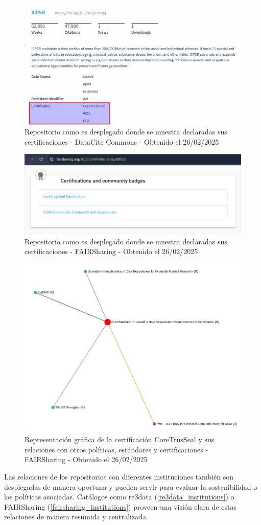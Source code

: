 \documentclass[runningheads]{llncs}
\begin{document}
\begin{figure}
    \centering
    \includegraphics[width=0.5\linewidth]{img/datacite_certified_repo.png}
    \caption{Repositorio como es desplegado donde se muestra declaradas sus certificaciones - DataCite Commons - Obtenido el 26/02/2025}
    \label{fig:datacite_certified_repo}
\end{figure}

\begin{figure}
    \centering
    \includegraphics[width=0.5\linewidth]{img/fairsharing_certified_repo.png}
    \caption{Repositorio como es desplegado donde se muestra declaradas sus certificaciones - FAIRSharing - Obtenido el 26/02/2025}
    \label{fig:fairsharing_certified_repo}
\end{figure}

\begin{figure}
    \centering
    \includegraphics[width=0.5\linewidth]{img/certificates_relations.png}
    \caption{Representación gráfica de la certificación CoreTrusSeal y sus relaciones con otros políticas, estándares y certificaciones - FAIRSharing - Obtenido el 26/02/2025}
    \label{fig:certificates_relations}
\end{figure}

Las relaciones de los repositorios con diferentes instituciones también son desplegadas de manera oportuna y pueden servir para evaluar la sostenibilidad o las políticas asociadas. Catálogos como re3data (\ref{re3data_institutions}) o FAIRSharing (\ref{fairsharing_institutions}) proveen una visión clara de estas relaciones de manera resumida y centralizada.\\
\end{document}
